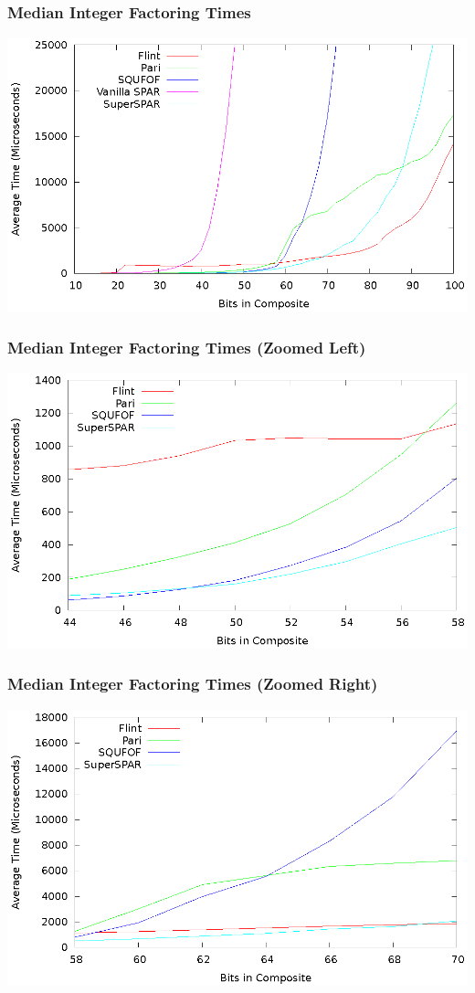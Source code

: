 \documentclass{beamer}
\begin{document}
\begin{frame}
\frametitle{Median Integer Factoring Times}
\includegraphics[scale=0.86]{factor-median}
\end{frame}
\begin{frame}
\frametitle{Median Integer Factoring Times (Zoomed Left)}
\includegraphics[scale=0.86]{factor-median-zoom-left}
\end{frame}
\begin{frame}
\frametitle{Median Integer Factoring Times (Zoomed Right)}
\includegraphics[scale=0.86]{factor-median-zoom-right}
\end{frame}
\end{document}
